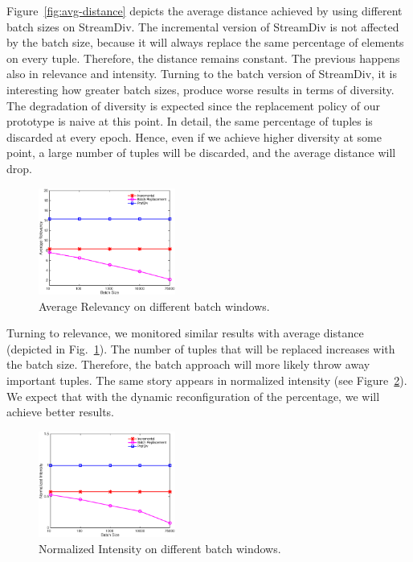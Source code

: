 Figure~\ref{fig:avg-distance} depicts the average distance
achieved by using different batch sizes on StreamDiv.
The incremental version of StreamDiv is not affected by
the batch size, because it will always replace the
same percentage of elements on every tuple.
Therefore, the distance remains constant.
The previous happens also in
relevance and intensity.
Turning to the batch version of StreamDiv, it is interesting
how greater batch sizes, produce worse results in terms of diversity.
The degradation of diversity is expected since the replacement
policy of our prototype is naive at this point.
In detail, the same percentage of tuples
is discarded at every epoch. Hence, even if we achieve
higher diversity at some point, a large number of tuples
will be discarded, and the average distance will drop.

\begin{figure}[!htb]
\centering
\includegraphics[width=0.4\textwidth,height=0.4\textheight,keepaspectratio]{Figures/AverageRelevancy.eps}
\caption{Average Relevancy on different batch windows.}
\label{fig:avg-relevancy}
\end{figure}

Turning to relevance, we monitored similar results with
average distance (depicted in Fig.~\ref{fig:avg-relevancy}).
The number of tuples that will be replaced
increases with the batch size. Therefore, the batch approach
will more likely throw away important tuples.
The same story appears in normalized intensity (see Figure~\ref{fig:norm-intensity}).
We expect that with the dynamic reconfiguration of the
percentage, we will achieve better results.

\begin{figure}[!htb]
\centering
\includegraphics[width=0.4\textwidth,height=0.4\textheight,keepaspectratio]{Figures/NormalizedIntensity.eps}
\caption{Normalized Intensity on different batch windows.}
\label{fig:norm-intensity}
\end{figure}